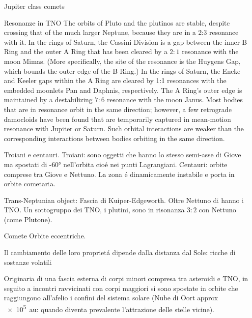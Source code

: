 \begin{wordonframe}{Jupiter class comets}

\end{wordonframe}

\begin{frame}{Resonanze in TNO}
The orbits of Pluto and the plutinos are stable, despite crossing that of the much larger Neptune, because they are in a 2:3 resonance with it.
In the rings of Saturn, the Cassini Division is a gap between the inner B Ring and the outer A Ring that has been cleared by a $2:1$ resonance with the moon Mimas. (More specifically, the site of the resonance is the Huygens Gap, which bounds the outer edge of the B Ring.)
    In the rings of Saturn, the Encke and Keeler gaps within the A Ring are cleared by 1:1 resonances with the embedded moonlets Pan and Daphnis, respectively. The A Ring's outer edge is maintained by a destabilizing $7:6$ resonance with the moon Janus.
Most bodies that are in resonance orbit in the same direction; however, a few retrograde damocloids have been found that are temporarily captured in mean-motion resonance with Jupiter or Saturn. Such orbital interactions are weaker than the corresponding interactions between bodies orbiting in the same direction.
\end{frame}

\begin{frame}{Troiani e centauri.}
Troiani: sono oggetti che hanno lo stesso semi-asse di Giove ma spostati di \ang{+-60} nell'orbita cio\'e nei punti Lagrangiani.
Centauri: orbite comprese tra Giove e Nettuno. La zona \'e dinamicamente instabile e porta in orbite cometaria.
\end{frame}

\begin{frame}{Trans-Neptunian object: Fascia di Kuiper-Edgeworth.}
Oltre Nettuno di hanno i TNO.
Un sottogruppo dei TNO, i plutini, sono in risonanza $3:2$ con Nettuno (come Plutone).
\end{frame}

\begin{frame}{Comete}
Orbite eccentriche.

Il cambiamento delle loro propriet\'a dipende dalla distanza dal Sole: ricche di sostanze volatili

Originaria di una fascia esterna di corpi minori compresa tra asteroidi e TNO, in seguito a incontri ravvicinati con corpi maggiori si sono spostate in orbite che raggiungono all'afelio i confini del sistema solare (Nube di Oort approx \SI{e5}{\astronomicalunit}: quando diventa prevalente l'attrazione delle stelle vicine).
\end{frame}

